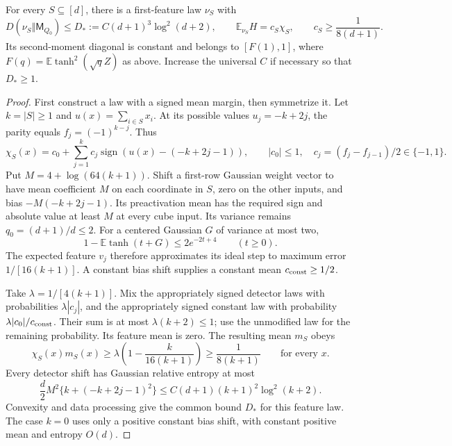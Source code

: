 \begin{lemma}
\label{lem:controlled-parity-law}
For every $S\subseteq[d]$, there is a first-feature law $\nu_S$ with
\[
 D(\nu_S\Vert\mathsf M_{Q_0})\le D_*:=C(d+1)^3\log^2(d+2),
 \qquad \mathbb E_{\nu_S}H=c_S\chi_S,
 \qquad c_S\ge\frac1{8(d+1)}.
\]
Its second-moment diagonal is constant and belongs to $[F(1),1]$, where
$F(q)=\mathbb E\tanh^2(\sqrt qZ)$ as above. Increase the universal $C$
if necessary so that $D_*\ge1$.
\end{lemma}

\begin{proof}
First construct a law with a signed mean margin, then symmetrize it.
Let $k=|S|\ge1$ and $u(x)=\sum_{i\in S}x_i$.
At its possible values $u_j=-k+2j$, the parity equals
$f_j=(-1)^{k-j}$. Thus
\[
 \chi_S(x)=c_0+\sum_{j=1}^k c_j
       \operatorname{sign}(u(x)-(-k+2j-1)),
 \qquad |c_0|\le1,\quad c_j=(f_j-f_{j-1})/2\in\{-1,1\}.
\]
Put $M=4+\log(64(k+1))$.
Shift a first-row Gaussian weight vector to have mean coefficient $M$
on each coordinate in $S$, zero on the other inputs, and bias
$-M(-k+2j-1)$. Its preactivation mean has the required sign and
absolute value at least $M$ at every cube input. Its variance remains
$q_0=(d+1)/d\le2$. For a centered Gaussian $G$ of variance at most two,
\[
 1-\mathbb E\tanh(t+G)\le2e^{-2t+4}\qquad(t\ge0).
\]
The expected feature $v_j$ therefore approximates its ideal step to
maximum error $1/[16(k+1)]$.
A constant bias shift supplies a constant mean $c_{\rm const}\ge1/2$.

Take $\lambda=1/[4(k+1)]$. Mix the appropriately signed detector
laws with probabilities $\lambda|c_j|$, and the appropriately signed
constant law with probability $\lambda|c_0|/c_{\rm const}$.
Their sum is at most $\lambda(k+2)\le1$; use the unmodified law for
the remaining probability. Its feature mean is zero. The resulting
mean $m_S$ obeys
\[
 \chi_S(x)m_S(x)\ge\lambda\left(1-\frac{k}{16(k+1)}\right)
                  \ge\frac1{8(k+1)}
 \qquad\text{for every }x.
\]
Every detector shift has Gaussian relative entropy at most
\[
 \frac d2 M^2\{k+(-k+2j-1)^2\}
 \le C(d+1)(k+1)^2\log^2(k+2).
\]
Convexity and data processing give the common bound $D_*$ for this
feature law. The case $k=0$ uses only a positive constant bias shift,
with constant positive mean and entropy $O(d)$.


\end{proof}
